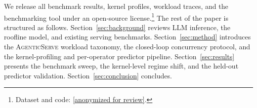 We release all benchmark results, kernel profiles, workload traces, and the benchmarking tool under an open-source license.\footnote{Dataset and code: \url{[anonymized for review]}.} The rest of the paper is structured as follows. Section~\ref{sec:background} reviews LLM inference, the roofline model, and existing serving benchmarks. Section~\ref{sec:method} introduces the \textsc{AgenticServe} workload taxonomy, the closed-loop concurrency protocol, and the kernel-profiling and per-operator predictor pipeline. Section~\ref{sec:results} presents the benchmark sweep, the kernel-level regime shift, and the held-out predictor validation. Section~\ref{sec:conclusion} concludes.
